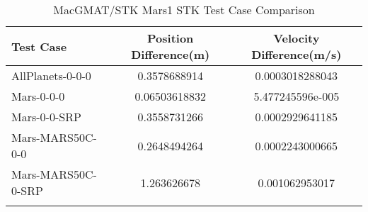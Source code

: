 \begin{table}[htbp!]
\centering
\caption{ MacGMAT/STK Mars1 STK Test Case Comparison}
      \begin{tabular}{lcc}
      \hline\hline
          Test Case & Position Difference(m) & Velocity Difference(m/s) \\
         \hline
         AllPlanets-0-0-0 & 0.3578688914 & 0.0003018288043 \\
         Mars-0-0-0 & 0.06503618832 & 5.477245596e-005 \\
         Mars-0-0-SRP & 0.3558731266 & 0.0002929641185 \\
         Mars-MARS50C-0-0 & 0.2648494264 & 0.0002243000665 \\
         Mars-MARS50C-0-SRP & 1.263626678 & 0.001062953017 \\
      \hline\hline
      \label{Table: Mars1 STK Table} 
\end{tabular}
\end{table}
